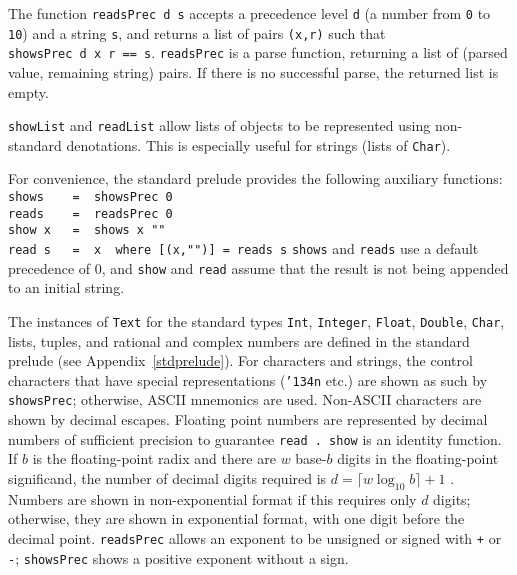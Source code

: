 The function \mbox{\tt readsPrec\ d\ s} accepts a precedence level \mbox{\tt d} (a number
from \mbox{\tt 0} to \mbox{\tt 10}) and a string \mbox{\tt s}, and returns a list of pairs
\mbox{\tt (x,r)} such that \mbox{\tt showsPrec\ d\ x\ r\ ==\ s}.  \mbox{\tt readsPrec} is a parse
function, returning a list of (parsed value, remaining string) pairs.
If there is no successful parse, the returned list is empty.

\mbox{\tt showList} and \mbox{\tt readList} allow lists of objects to be represented
using non-standard denotations.  This is especially useful for strings
(lists of \mbox{\tt Char}).


For convenience, the standard prelude provides the following auxiliary functions:
\bprog
\mbox{\tt shows\ \ \ \ =\ \ showsPrec\ 0}\\
\mbox{\tt reads\ \ \ \ =\ \ readsPrec\ 0}\\
\mbox{\tt show\ x\ \ \ =\ \ shows\ x\ ""}\\
\mbox{\tt read\ s\ \ \ =\ \ x\ \ where\ [(x,"")]\ =\ reads\ s}
\eprog
\mbox{\tt shows} and \mbox{\tt reads} use a default precedence of 0, and \mbox{\tt show} and \mbox{\tt read}
assume that the result is not being appended to an initial string.

The instances of \mbox{\tt Text} for the standard types \mbox{\tt Int}, \mbox{\tt Integer}, \mbox{\tt Float},
\mbox{\tt Double}, \mbox{\tt Char}, lists, tuples, and rational and complex numbers are defined in the 
standard prelude (see Appendix~\ref{stdprelude}).
For characters and strings, the control characters that have special
representations (\mbox{\tt {\char'134}n} etc.) are shown as such by \mbox{\tt showsPrec};
otherwise, ASCII mnemonics are used.
Non-ASCII characters are shown by decimal escapes.
Floating point numbers are represented by decimal numbers
of sufficient precision to guarantee \mbox{\tt read\ .\ show} is an identity
function.  If $b$ is the floating-point radix and there are
$w$ base-$b$ digits in the floating-point significand,
the number of decimal digits required is
$d = \lceil w \log_{10} b \rceil + 1$ \cite{matula70}.
Numbers are shown in non-exponential format if this requires
only $d$ digits; otherwise, they are shown in exponential format,
with one digit before the decimal point.  \mbox{\tt readsPrec} allows
an exponent to be unsigned or signed with \mbox{\tt +} or \mbox{\tt -}; \mbox{\tt showsPrec}
shows a positive exponent without a sign.

